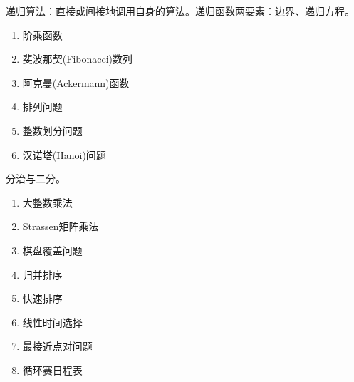 \documentclass[UTF8]{ctexart}
\newcommand\Emph[1]{\textcolor{cyan!80!black}{#1}}
\begin{document}
\BgThispage
\begin{summary}
递归算法：直接或间接地调用自身的算法。递归函数两要素：边界、递归方程。
\begin{enumerate}[itemsep=0pt,parsep=0pt]
  \item 阶乘函数
  \item 斐波那契(Fibonacci)数列
  \item 阿克曼(Ackermann)函数
  \item 排列问题
  \item 整数划分问题
  \item 汉诺塔(Hanoi)问题
\end{enumerate}
\tcblower
分治与二分。
\begin{enumerate}[itemsep=0pt,parsep=0pt]
  \item 大整数乘法
  \item Strassen矩阵乘法
  \item \Emph{棋盘覆盖问题}
  \item 归并排序
  \item 快速排序
  \item 线性时间选择
  \item 最接近点对问题
  \item 循环赛日程表
\end{enumerate}
\end{summary}
\end{document}
